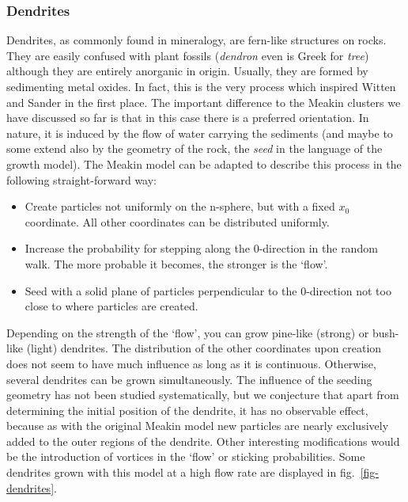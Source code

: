 \documentclass[twocolumn, 10pt]{scrartcl}
\begin{document}
            \subsubsection{Dendrites}
                Dendrites, as commonly found in mineralogy, are fern-like structures on rocks. They are easily confused
                with plant fossils (\emph{dendron} even is Greek for \emph{tree}) although they are entirely anorganic
                in origin. Usually, they are formed by sedimenting metal oxides. In fact, this is the very process
                which inspired Witten and Sander in the first place. The important difference to the Meakin clusters
                we have discussed so far is that in this case there is a preferred orientation. In nature, it is
                induced by the flow of water carrying the sediments (and maybe to some extend also by the geometry
                of the rock, the \emph{seed} in the language of the growth model). The Meakin model can be adapted
                to describe this process in the following straight-forward way:
                \begin{itemize}
                    \item Create particles not uniformly on the n-sphere, but with a fixed $x_0$ coordinate. All other
                        coordinates can be distributed uniformly.
                    \item Increase the probability for stepping along the 0-direction in the random walk. The more
                        probable it becomes, the stronger is the `flow'.
                    \item Seed with a solid plane of particles perpendicular to the 0-direction not too close to where
                        particles are created.
                \end{itemize}
                Depending on the strength of the `flow', you can grow pine-like (strong) or bush-like (light) dendrites.
                The distribution of the other coordinates upon creation does not seem to have much influence as long
                as it is continuous. Otherwise, several dendrites can be grown simultaneously. The influence of the
                seeding geometry has not been studied systematically, but we conjecture that apart from determining the
                initial position of the dendrite, it has no observable effect, because as with the original Meakin model
                new particles are nearly exclusively added to the outer regions of the dendrite. Other interesting
                modifications would be the introduction of vortices in the `flow' or sticking probabilities.
                Some dendrites grown with this model at a high flow rate are displayed in fig.~\ref{fig-dendrites}.
\end{document}
